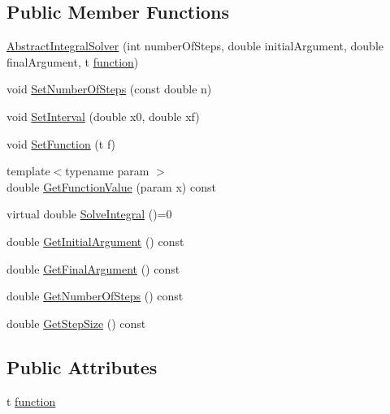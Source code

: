 \subsection*{Public Member Functions}
\begin{DoxyCompactItemize}
\item 
\hyperlink{class_abstract_integral_solver_a44d64706b428c7b0bd4c9779c4d32b6f}{Abstract\+Integral\+Solver} (int number\+Of\+Steps, double initial\+Argument, double final\+Argument, t \hyperlink{class_abstract_integral_solver_ae31c391a21c6057e313295ad04de8a69}{function})
\item 
void \hyperlink{class_abstract_integral_solver_ab74cb9894daf3bcc97e14158a6087d99}{Set\+Number\+Of\+Steps} (const double n)
\item 
void \hyperlink{class_abstract_integral_solver_a891baae0103a8b488cf6cd007c109844}{Set\+Interval} (double x0, double xf)
\item 
void \hyperlink{class_abstract_integral_solver_adfb6eb8d70ebaf103e25ce468ac38b40}{Set\+Function} (t f)
\item 
{\footnotesize template$<$typename param $>$ }\\double \hyperlink{class_abstract_integral_solver_ae2f3d78fabe31ebe3b328fb6c52a2209}{Get\+Function\+Value} (param x) const
\item 
virtual double \hyperlink{class_abstract_integral_solver_ad87cb44c5ef3122bc95be48f473ba399}{Solve\+Integral} ()=0
\item 
double \hyperlink{class_abstract_integral_solver_adb8ef30d8231a173ee85e91155829daa}{Get\+Initial\+Argument} () const
\item 
double \hyperlink{class_abstract_integral_solver_a30f25ec2dff6d5881875952bec1d1774}{Get\+Final\+Argument} () const
\item 
double \hyperlink{class_abstract_integral_solver_a90148ecbeb6396638c428a319a7031dd}{Get\+Number\+Of\+Steps} () const
\item 
double \hyperlink{class_abstract_integral_solver_a0220c77810a813699748b875627da1a7}{Get\+Step\+Size} () const
\end{DoxyCompactItemize}
\subsection*{Public Attributes}
\begin{DoxyCompactItemize}
\item 
t \hyperlink{class_abstract_integral_solver_ae31c391a21c6057e313295ad04de8a69}{function}
\end{DoxyCompactItemize}



